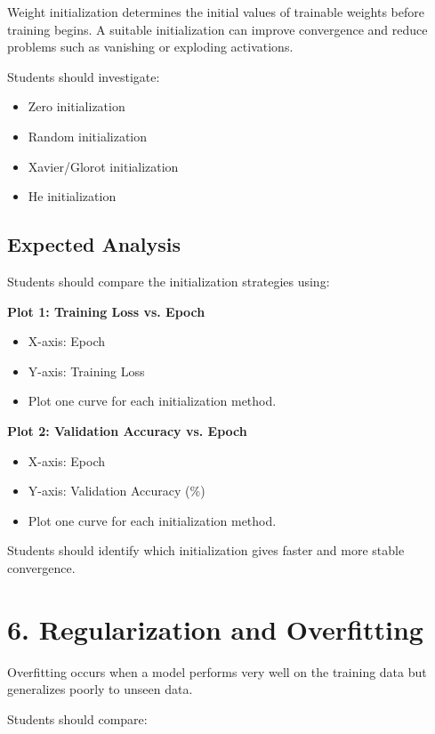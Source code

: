 \documentclass[10pt]{article}
\begin{document}
Weight initialization determines the initial values of trainable weights
before training begins. A suitable initialization can improve convergence
and reduce problems such as vanishing or exploding activations.

Students should investigate:

\begin{itemize}
\item Zero initialization
\item Random initialization
\item Xavier/Glorot initialization
\item He initialization
\end{itemize}

\subsection*{Expected Analysis}

Students should compare the initialization strategies using:

\textbf{Plot 1: Training Loss vs. Epoch}

\begin{itemize}
\item X-axis: Epoch
\item Y-axis: Training Loss
\item Plot one curve for each initialization method.
\end{itemize}

\textbf{Plot 2: Validation Accuracy vs. Epoch}

\begin{itemize}
\item X-axis: Epoch
\item Y-axis: Validation Accuracy (\%)
\item Plot one curve for each initialization method.
\end{itemize}

Students should identify which initialization gives faster and more
stable convergence.

\section*{6. Regularization and Overfitting}

Overfitting occurs when a model performs very well on the training data
but generalizes poorly to unseen data.

Students should compare:
\end{document}
